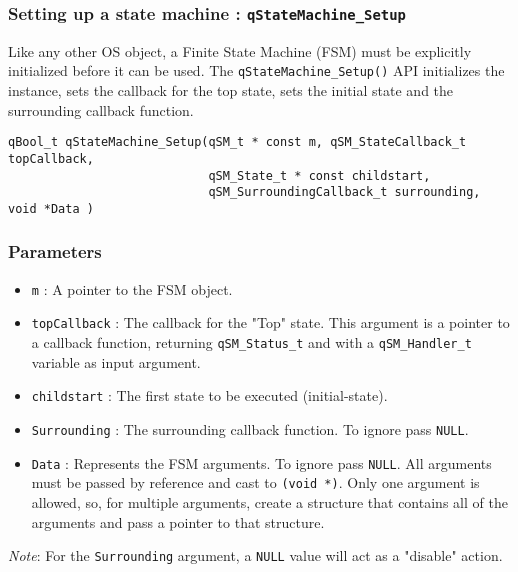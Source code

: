 \subsubsection{Setting up a state machine : \texorpdfstring{\lstinline{qStateMachine_Setup}}{qStateMachine_Setup} }
Like any other OS object, a Finite State Machine (FSM) must be explicitly initialized before it can be used. The \lstinline{qStateMachine_Setup()} API   initializes the instance, sets the callback for the top state, sets the initial state and the surrounding callback function.
\medskip

\begin{lstlisting}[style=CStyle]
qBool_t qStateMachine_Setup(qSM_t * const m, qSM_StateCallback_t topCallback, 
                            qSM_State_t * const childstart, 
                            qSM_SurroundingCallback_t surrounding, void *Data )
\end{lstlisting}

\subsubsection*{Parameters}
\begin{itemize}
    \item \lstinline{m} : A pointer to the FSM object.
    \item \lstinline{topCallback} :  The callback for the "Top" state. This argument is a pointer to a callback function, returning \lstinline{qSM_Status_t} and with a \lstinline{qSM_Handler_t} variable as input argument.
    \item \lstinline{childstart} : The first state to be executed (initial-state). 
    \item \lstinline{Surrounding} : The surrounding callback function. To ignore pass \lstinline{NULL}.
    \item \lstinline{Data} : Represents the FSM arguments. To ignore pass \lstinline{NULL}. All arguments must be passed by reference and cast to \lstinline{(void *)}. Only one argument is allowed, so, for multiple arguments, create a structure that contains all of the arguments and pass a pointer to that structure. 
\end{itemize}  

\begin{tcolorbox}
\ArrowBoldDownRight \textit{Note}: For the \lstinline{Surrounding} argument, a \lstinline{NULL} value will act as a "disable" action.
\end{tcolorbox}


